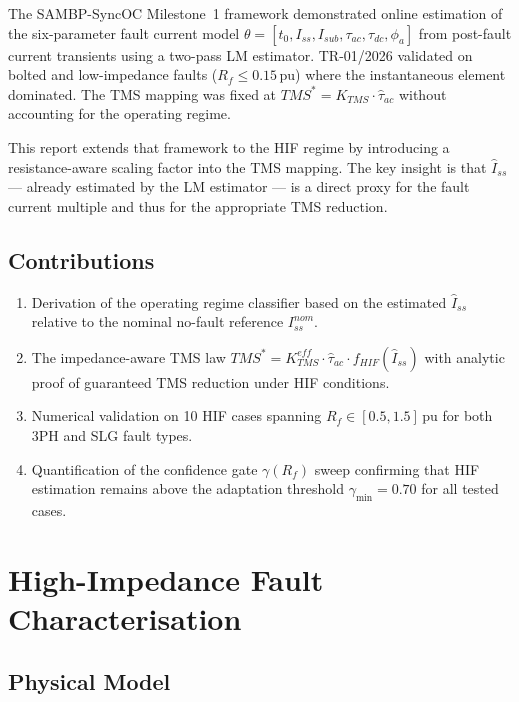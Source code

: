 \documentclass[12pt,a4paper]{article}
\theoremstyle{definition}
\theoremstyle{plain}
\begin{document}
The SAMBP-SyncOC Milestone~1 framework \citep{TR01_2026} demonstrated
online estimation of the six-parameter fault current model
$\theta = [t_0, I_{ss}, I_{sub}, \tau_{ac}, \tau_{dc}, \phi_a]$ from
post-fault current transients using a two-pass LM estimator.  TR-01/2026
validated on bolted and low-impedance faults ($R_f \leq 0.15\,\text{pu}$)
where the instantaneous element dominated.  The TMS mapping was fixed at
$TMS^* = K_{TMS}\cdot\hat{\tau}_{ac}$ without accounting for the operating
regime.

This report extends that framework to the HIF regime by introducing a
resistance-aware scaling factor into the TMS mapping.  The key insight is that
$\hat{I}_{ss}$ — already estimated by the LM estimator — is a direct proxy
for the fault current multiple and thus for the appropriate TMS reduction.

\subsection{Contributions}
\begin{enumerate}
  \item Derivation of the operating regime classifier based on the estimated
        $\hat{I}_{ss}$ relative to the nominal no-fault reference
        $I_{ss}^{nom}$.
  \item The impedance-aware TMS law $TMS^* = K_{TMS}^{eff}\cdot\hat{\tau}_{ac}
        \cdot f_{HIF}(\hat{I}_{ss})$ with analytic proof of guaranteed TMS
        reduction under HIF conditions.
  \item Numerical validation on 10 HIF cases spanning $R_f \in [0.5,1.5]\,\text{pu}$
        for both 3PH and SLG fault types.
  \item Quantification of the confidence gate $\gamma(R_f)$ sweep confirming
        that HIF estimation remains above the adaptation threshold
        $\gamma_{\min} = 0.70$ for all tested cases.
\end{enumerate}

\section{High-Impedance Fault Characterisation}
\label{sec:hif}

\subsection{Physical Model}
\label{sec:hif:model}
\end{document}
